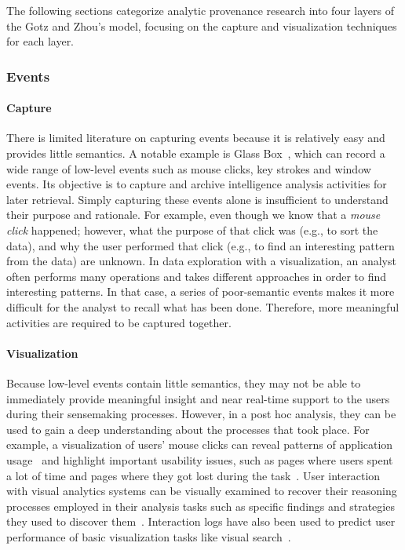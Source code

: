 The following sections categorize analytic provenance research into four layers of the Gotz and Zhou's model, focusing on the capture and visualization techniques for each layer.

\subsubsection{Events}

\paragraph{Capture}
There is limited literature on capturing events because it is relatively easy and provides little semantics. A notable example is Glass Box~\cite{Cowley2006}, which can record a wide range of low-level events such as mouse clicks, key strokes and window events. Its objective is to capture and archive intelligence analysis activities for later retrieval. Simply capturing these events alone is insufficient to understand their purpose and rationale. For example, even though we know that a \textit{mouse click} happened; however, what the purpose of that click was (e.g., to sort the data), and why the user performed that click (e.g., to find an interesting pattern from the data) are unknown. In data exploration with a visualization, an analyst often performs many operations and takes different approaches in order to find interesting patterns. In that case, a series of poor-semantic events makes it more difficult for the analyst to recall what has been done. Therefore, more meaningful activities are required to be captured together.

\paragraph{Visualization}
Because low-level events contain little semantics, they may not be able to immediately provide meaningful insight and near real-time support to the users during their sensemaking processes. However, in a post hoc analysis, they can be used to gain a deep understanding about the processes that took place. For example, a visualization of users' mouse clicks can reveal patterns of application usage~\cite{Matejka2013} and highlight important usability issues, such as pages where users spent a lot of time and pages where they got lost during the task~\cite{Waterson2002}. User interaction with visual analytics systems can be visually examined to recover their reasoning processes employed in their analysis tasks such as specific findings and strategies they used to discover them~\cite{Dou2009, Guo2016}. Interaction logs have also been used to predict user performance of basic visualization tasks like visual search~\cite{Brown2014}.

